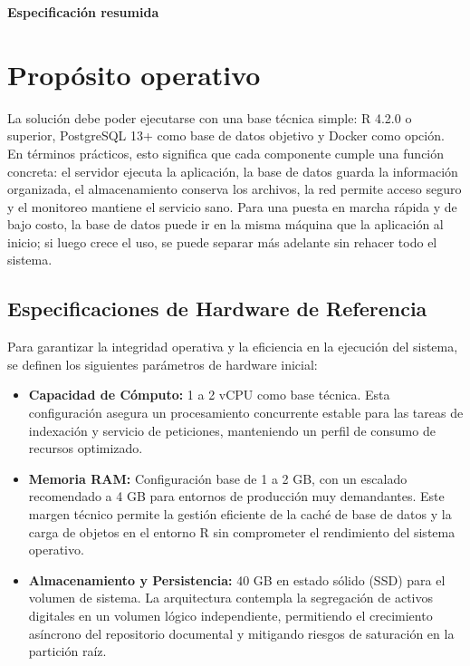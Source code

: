 \documentclass[12pt,a4paper]{report}
\begin{document}
\begin{center}
{\LARGE\bfseries Especificación resumida}
\end{center}

\section*{Propósito operativo}
La solución debe poder ejecutarse con una base técnica simple: R 4.2.0 o superior, PostgreSQL 13+ como base de datos objetivo y Docker como opción.
En términos prácticos, esto significa que cada componente cumple una función concreta: el servidor ejecuta la aplicación, la base de datos guarda la información organizada, el almacenamiento conserva los archivos, la red permite acceso seguro y el monitoreo mantiene el servicio sano.
Para una puesta en marcha rápida y de bajo costo, la base de datos puede ir en la misma máquina que la aplicación al inicio; si luego crece el uso, se puede separar más adelante sin rehacer todo el sistema.

\subsection*{Especificaciones de Hardware de Referencia}

Para garantizar la integridad operativa y la eficiencia en la ejecución del sistema, se definen los siguientes parámetros de hardware inicial:

\begin{itemize}
    \item \textbf{Capacidad de Cómputo:} 1 a 2 vCPU como base técnica. Esta configuración asegura un procesamiento concurrente estable para las tareas de indexación y servicio de peticiones, manteniendo un perfil de consumo de recursos optimizado.
    \item \textbf{Memoria RAM:} Configuración base de 1 a 2 GB, con un escalado recomendado a 4 GB para entornos de producción muy demandantes. Este margen técnico permite la gestión eficiente de la caché de base de datos y la carga de objetos en el entorno R sin comprometer el rendimiento del sistema operativo.
    \item \textbf{Almacenamiento y Persistencia:} 40 GB en estado sólido (SSD) para el volumen de sistema. La arquitectura contempla la segregación de activos digitales en un volumen lógico independiente, permitiendo el crecimiento asíncrono del repositorio documental y mitigando riesgos de saturación en la partición raíz.
\end{itemize}
\end{document}
